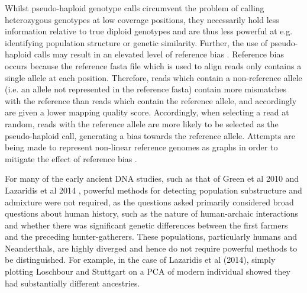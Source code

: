 Whilst pseudo-haploid genotype calls circumvent the problem of calling heterozygous genotypes at low coverage positions, they necessarily hold less information relative to true diploid genotypes and are thus less powerful at e.g. identifying population structure or genetic similarity. Further, the use of pseudo-haploid calls may result in an elevated level of reference bias \cite{GuntherRefBias, Martiniano2017, martiniano2020removing}. Reference bias occurs because the reference fasta file which is used to align reads only contains a single allele at each position. Therefore, reads which contain a non-reference allele (i.e. an allele not represented in the reference fasta) contain more mismatches with the reference than reads which contain the reference allele, and accordingly are given a lower mapping quality score. Accordingly, when selecting a read at random, reads with the reference allele are more likely to be selected as the pseudo-haploid call, generating a bias towards the reference allele. Attempts are being made to represent non-linear reference genomes as graphs in order to mitigate the effect of reference bias \cite{Garrison2018, martiniano2020removing}.

For many of the early ancient DNA studies, such as that of Green et al 2010 \cite{Green2010} and Lazaridis et al 2014 \cite{Lazaridis2014}, powerful methods for detecting population substructure and admixture were not required, as the questions asked primarily considered broad questions about human history, such as the nature of human-archaic interactions and whether there was significant genetic differences between the first farmers and the preceding hunter-gatherers. These populations, particularly humans and Neanderthals, are highly diverged and hence do not require powerful methods to be distinguished. For example, in the case of Lazaridis et al (2014), simply plotting Loschbour and Stuttgart on a PCA of modern individual showed they had substantially different ancestries.

